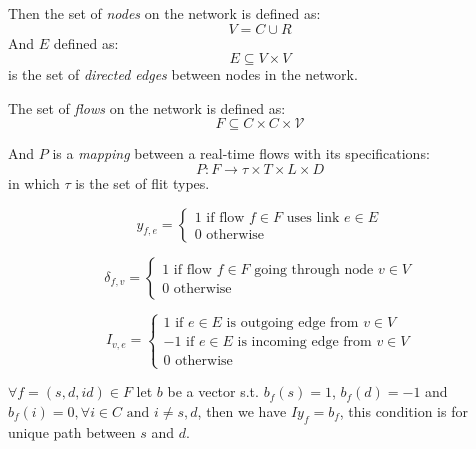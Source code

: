 \documentclass[a4]{article}
\begin{document}
Then the set of {\em nodes} on the network is defined as:
\begin{equation}\label{reio}
V = C \cup R
\end{equation}
And $E$ defined as:
\begin{equation}
E \subseteq V \times V 
\end{equation}
is the set of {\em directed edges} between nodes in the network.

The set of {\em flows} on the network is defined as:
\begin{equation}
F \subseteq C \times C \times \mathcal{V} 
\end{equation}

And $P$ is a {\em mapping } between a real-time flows with its specifications:
\begin{equation}
P:F \rightarrow \tau \times T \times L \times D
\end{equation}
in which $\tau$ is the set of flit types.

\begin{equation}
y_{f,e} = \left\{ \begin{array}{lrc}
1 \mbox{ if flow } f \in F \mbox{ uses link } e \in E \\
0 \mbox{ otherwise} 
\end{array}\right.
\end{equation}

\begin{equation}
\delta_{f,v} = \left\{ \begin{array}{lrc}
1 \mbox{ if flow } f \in F \mbox{ going through node } v \in V \\
0 \mbox{ otherwise} 
\end{array}\right.
\end{equation}

\begin{equation}
I_{v,e} = \left\{ \begin{array}{lrc}
1 \mbox{ if } e \in E \mbox{ is outgoing edge from } v \in V \\
-1 \mbox{ if } e \in E \mbox{ is incoming edge from } v \in V \\
0 \mbox{ otherwise}
\end{array}\right. 
\end{equation}

$\forall f=(s, d, id) \in F$  let $b$ be a vector s.t. $b_f(s) = 1$, 
$b_f(d) = -1$ and $b_f(i) = 0, \forall i \in C \mbox{ and } i \neq s, d$,
 then we have $Iy_f=b_f$, this condition is for unique path between $s$ and $d$.
\end{document}
